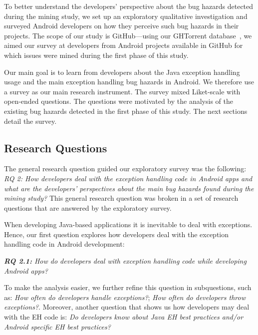 To better understand the developers' perspective about the bug hazards detected during the mining study, we set up an exploratory qualitative investigation and surveyed Android developers on how they perceive such bug hazards in their projects. The scope of our study is GitHub---using our GHTorrent database~\cite{Gousi13}, we aimed our survey at developers from Android projects available in GitHub for which issues were mined during the first phase of this study. 

Our main goal is to learn from developers about the Java exception handling usage and the main exception handling bug hazards in Android. We therefore use a survey as our main research instrument. The survey mixed  Liket-scale with open-ended questions. The questions were motivated by the analysis of the existing bug hazards detected in the first phase of this study. The next sections detail the survey.



\subsection{Research Questions}

The general research question guided our exploratory survey was the following: \emph{RQ 2: How developers deal with the exception handling code in Android apps and what are the developers' perspectives about the main bug hazards found during the mining study?} This general research question was broken in a set of research questions that are answered by the exploratory survey.

When developing Java-based applications it is inevitable to deal with exceptions. Hence, our first question explores how developers deal with the exception handling code in Android development:

\emph{\textbf{RQ 2.1:} How do developers deal with exception handling code while developing Android apps?} 

To make the analysis easier, we further refine this question in subquestions, such as: \emph{How often do developers handle exceptions?}; \emph{How often do developers throw exceptions?}. Moreover, another question that shows us how developers may deal with the EH code is: \emph{Do developers know about Java EH best practices and/or Android specific EH best practices?}
 

